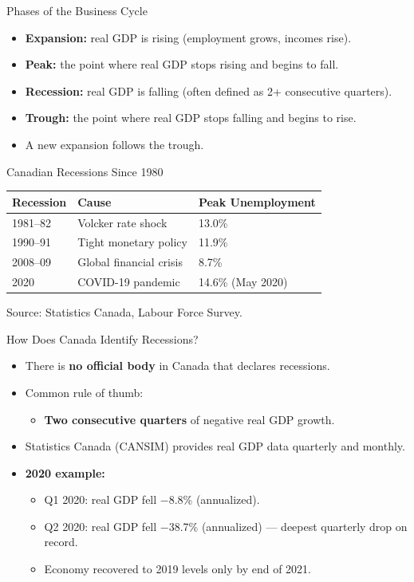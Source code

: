 \documentclass[aspectratio=169]{beamer}
\begin{document}
\begin{frame}{Phases of the Business Cycle}
\transfade
\begin{itemize}
  \item \textbf{Expansion:} real GDP is rising (employment grows, incomes rise).
  \item \textbf{Peak:} the point where real GDP stops rising and begins to fall.
  \item \textbf{Recession:} real GDP is falling (often defined as 2+ consecutive quarters).
  \item \textbf{Trough:} the point where real GDP stops falling and begins to rise.
  \item A new expansion follows the trough.
\end{itemize}
\vspace{0.3em}
\begin{block}{Canadian Recessions Since 1980}
\small
\begin{tabular}{lll}
\toprule
\textbf{Recession} & \textbf{Cause} & \textbf{Peak Unemployment} \\
\midrule
1981--82 & Volcker rate shock & 13.0\% \\
1990--91 & Tight monetary policy & 11.9\% \\
2008--09 & Global financial crisis & 8.7\% \\
2020 & COVID-19 pandemic & \alert{14.6\%} (May 2020) \\
\bottomrule
\end{tabular}
\end{block}
{\tiny Source: Statistics Canada, Labour Force Survey.}
\end{frame}

\begin{frame}{How Does Canada Identify Recessions?}
\transfade
\begin{itemize}
  \item There is \textbf{no official body} in Canada that declares recessions.
  \item Common rule of thumb:
  \begin{itemize}
    \item \textbf{Two consecutive quarters} of negative real GDP growth.
  \end{itemize}
  \item Statistics Canada (CANSIM) provides real GDP data quarterly and monthly.
  \item \textbf{2020 example:}
  \begin{itemize}
    \item Q1 2020: real GDP fell $-$8.8\% (annualized).
    \item Q2 2020: real GDP fell $-$38.7\% (annualized) --- deepest quarterly drop on record.
    \item Economy recovered to 2019 levels only by end of 2021.
  \end{itemize}
\end{itemize}
\end{frame}
\end{document}
